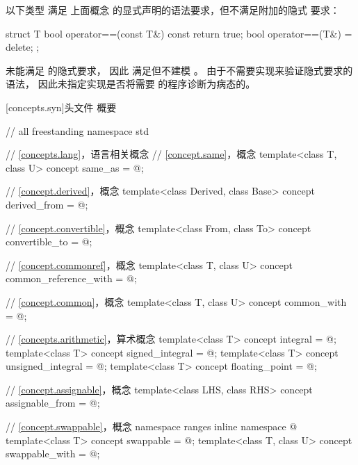 \pnum
\begin{example}
以下类型  满足
上面概念  的显式声明的语法要求，但不满足附加的隐式
要求：

\begin{codeblock}
struct T {
  bool operator==(const T&) const { return true; }
  bool operator==(T&) = delete;
};
\end{codeblock}

 未能满足  的隐式要求，
因此  满足但不建模 。
由于不需要实现来验证隐式要求的语法，
因此未指定实现是否将需要  的程序诊断为病态的。
\end{example}

[concepts.syn]{头文件  概要}

%
\begin{codeblock}
// all freestanding
namespace std {
  // \ref{concepts.lang}，语言相关概念
  // \ref{concept.same}，概念 
  template<class T, class U>
    concept same_as = @\seebelow@;

  // \ref{concept.derived}，概念 
  template<class Derived, class Base>
    concept derived_from = @\seebelow@;

  // \ref{concept.convertible}，概念 
  template<class From, class To>
    concept convertible_to = @\seebelow@;

  // \ref{concept.commonref}，概念 
  template<class T, class U>
    concept common_reference_with = @\seebelow@;

  // \ref{concept.common}，概念 
  template<class T, class U>
    concept common_with = @\seebelow@;

  // \ref{concepts.arithmetic}，算术概念
  template<class T>
    concept integral = @\seebelow@;
  template<class T>
    concept signed_integral = @\seebelow@;
  template<class T>
    concept unsigned_integral = @\seebelow@;
  template<class T>
    concept floating_point = @\seebelow@;

  // \ref{concept.assignable}，概念 
  template<class LHS, class RHS>
    concept assignable_from = @\seebelow@;

  // \ref{concept.swappable}，概念 
  namespace ranges {
    inline namespace @
  }
  template<class T>
    concept swappable = @\seebelow@;
  template<class T, class U>
    concept swappable_with = @\seebelow@;

}
\end{codeblock}
